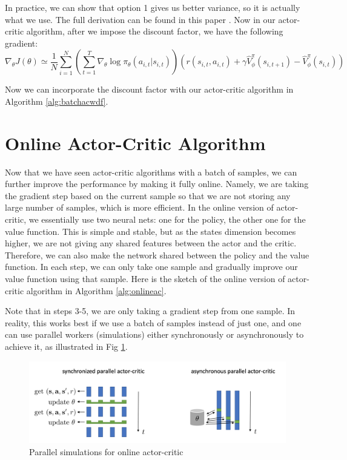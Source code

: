 In practice, we can show that option 1 gives us better variance, so it is actually what we use. The full derivation can be found in this paper \cite{thomas2014bias}. Now in our actor-critic algorithm, after we impose the discount factor, we have the following gradient:
$$\nabla_\theta J(\theta) \simeq \frac{1}{N}\sum_{i=1}^N\left(\sum_{t=1}^T\nabla_\theta \log\pi_\theta(a_{i,t}|s_{i,t})\right)\left(r(s_{i,t},a_{i,t}) + \gamma\hat{V}_\phi^\pi(s_{i,t+1})-\hat{V}_\phi^\pi(s_{i,t})\right)$$

Now we can incorporate the discount factor with our actor-critic algorithm in Algorithm \ref{alg:batchacwdf}.


\section{Online Actor-Critic Algorithm}
Now that we have seen actor-critic algorithms with a batch of samples, we can further improve the performance by making it fully online. Namely, we are taking the gradient step based on the current sample so that we are not storing any large number of samples, which is more efficient. In the online version of actor-critic, we essentially use two neural nets: one for the policy, the other one for the value function. This is simple and stable, but as the states dimension becomes higher, we are not giving any shared features between the actor and the critic. Therefore, we can also make the network shared between the policy and the value function. In each step, we can only take one sample and gradually improve our value function using that sample. Here is the sketch of the online version of actor-critic algorithm in Algorithm \ref{alg:onlineac}. 

Note that in steps 3-5, we are only taking a gradient step from one sample. In reality, this works best if we use a batch of samples instead of just one, and one can use parallel workers (simulations) either synchronously or asynchronously to achieve it, as illustrated in Fig \ref{fig:parallelsim}.
\begin{figure}
    \centering
    \includegraphics[scale=0.5]{figures/parallelsim.png}
    \caption{Parallel simulations for online actor-critic}
    \label{fig:parallelsim}
\end{figure}

